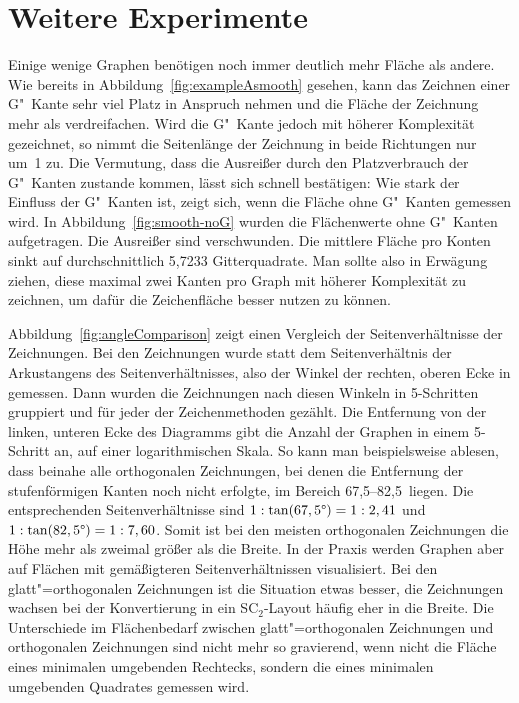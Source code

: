 \documentclass[a4paper]{scrreprt}
\theoremstyle{definition}
\begin{document}
\section{Weitere Experimente}

Einige wenige Graphen benötigen noch immer deutlich mehr Fläche als andere. Wie bereits in Abbildung~\ref{fig:exampleAsmooth} gesehen, kann das Zeichnen einer G"~Kante sehr viel Platz in Anspruch nehmen und die Fläche der Zeichnung mehr als verdreifachen. Wird die G"~Kante jedoch mit höherer Komplexität gezeichnet, so nimmt die Seitenlänge der Zeichnung in beide Richtungen nur um~1 zu. Die Vermutung, dass die Ausreißer durch den Platzverbrauch der G"~Kanten zustande kommen, lässt sich schnell bestätigen: Wie stark der Einfluss der G"~Kanten ist, zeigt sich, wenn die Fläche ohne G"~Kanten gemessen wird. In Abbildung~\ref{fig:smooth-noG} wurden die Flächenwerte ohne G"~Kanten aufgetragen. Die Ausreißer sind verschwunden. Die mittlere Fläche pro Konten sinkt auf durchschnittlich 5,7233 Gitterquadrate. Man sollte also in Erwägung ziehen, diese maximal zwei Kanten pro Graph mit höherer Komplexität zu zeichnen, um dafür die Zeichenfläche besser nutzen zu können.

Abbildung~\ref{fig:angleComparison} zeigt einen Vergleich der Seitenverhältnisse der Zeichnungen. Bei den Zeichnungen wurde statt dem Seitenverhältnis der Arkustangens des Seitenverhältnisses, also der Winkel der rechten, oberen Ecke in gemessen. Dann wurden die Zeichnungen nach diesen Winkeln in 5\textdegree-Schritten gruppiert und für jeder der Zeichenmethoden gezählt. Die Entfernung von der linken, unteren Ecke des Diagramms gibt die Anzahl der Graphen in einem 5\textdegree-Schritt an, auf einer logarithmischen Skala. So kann man beispielsweise ablesen, dass beinahe alle orthogonalen Zeichnungen, bei denen die Entfernung der stufenförmigen Kanten noch nicht erfolgte, im Bereich 67,5\textdegree--82,5\textdegree\ liegen. Die entsprechenden Seitenverhältnisse sind $1 : \tan(67,5\text{\textdegree}) = 1 : 2,41$ und $1 : \tan(82,5\text{\textdegree}) = 1 : 7,60$. Somit ist bei den meisten orthogonalen Zeichnungen die Höhe mehr als zweimal größer als die Breite. In der Praxis werden Graphen aber auf Flächen mit gemäßigteren Seitenverhältnissen visualisiert. Bei den glatt"=orthogonalen Zeichnungen ist die Situation etwas besser, die Zeichnungen wachsen bei der Konvertierung in ein SC$_2$-Layout häufig eher in die Breite. Die Unterschiede im Flächenbedarf zwischen glatt"=orthogonalen Zeichnungen und orthogonalen Zeichnungen sind nicht mehr so gravierend, wenn nicht die Fläche eines minimalen umgebenden Rechtecks, sondern die eines minimalen umgebenden Quadrates gemessen wird.
\end{document}
